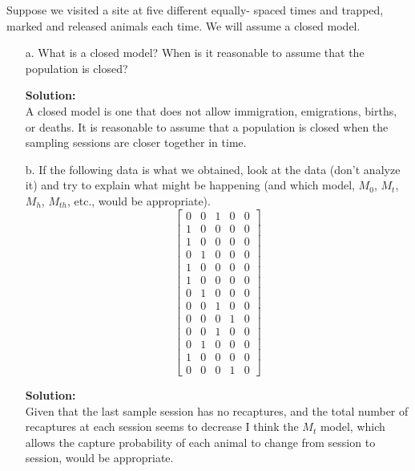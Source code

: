 \documentclass[12pt]{article}
\makeatletter
\theoremstyle{homework}
\newenvironment{exercise}[1]
{\def\@currentlabel{#1}\exercisecore}
{\endexercisecore}
\newcommand{\localhead}[1]{\par\smallskip\noindent\textbf{#1}\nobreak\\}%
\newcommand\solution{\localhead{Solution:}}
\makeatother
\begin{document}
\begin{exercise}{3} Suppose we visited a site at five different equally- spaced times and trapped, marked and released animals each time. We will assume a closed model.\\
  \begin{enumerate}
    \item[a.] What is a closed model? When is it reasonable to assume that the population is closed? \\
    \solution A closed model is one that does not allow immigration, emigrations, births, or deaths. It is reasonable to assume that 
    a population is closed when the sampling sessions are closer together in time.
    \vspace{.15in}
    \item[b.] If the following data is what we obtained, look at the data (don't analyze it) and try to explain what might be happening (and which model, $M_0$, $M_t$, $M_h$, $M_{th}$, etc., would be appropriate).\\
    \begin{equation*}
      \begin{bmatrix}
        0&0&1&0&0\\
        1&0&0&0&0\\
        1&0&0&0&0\\
        0&1&0&0&0\\
        1&0&0&0&0\\
        1&0&0&0&0\\
        0&1&0&0&0\\
        0&0&1&0&0\\
        0&0&0&1&0\\
        0&0&1&0&0\\
        0&1&0&0&0\\
        1&0&0&0&0\\
        0&0&0&1&0
      \end{bmatrix}
    \end{equation*} 
    \solution  Given that the last sample session has no recaptures, and the total number of recaptures at each session seems to decrease I think the $M_t$ model, which allows the capture probability 
    of each animal to change from session to session, would be appropriate. \\


\end{enumerate}
\end{exercise}
\end{document}
